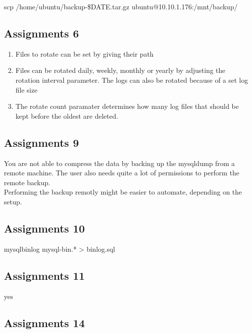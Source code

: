 scp /home/ubuntu/backup-\$DATE.tar.gz ubuntu@10.10.1.176:/mnt/backup/

\subsection{Assignments 6} 
\begin{enumerate}
\item Files to rotate can be set by giving their path
\item Files can be rotated daily, weekly, monthly or yearly by adjusting the rotation interval parameter. The logs can also be rotated because of a set log file size
\item The rotate count paramater determines how many log files that should be kept before the oldest are deleted.
\end{enumerate}

\subsection{Assignments 9} 
You are not able to compress the data by backing up the mysqldump from a remote machine. The user also needs quite a lot of permissions to perform the remote backup.\\
Performing the backup remotly might be easier to automate, depending on the setup.

\subsection{Assignments 10} 
mysqlbinlog mysql-bin.* > binlog.sql

\subsection{Assignments 11} 
yes

\subsection{Assignments 14} 
